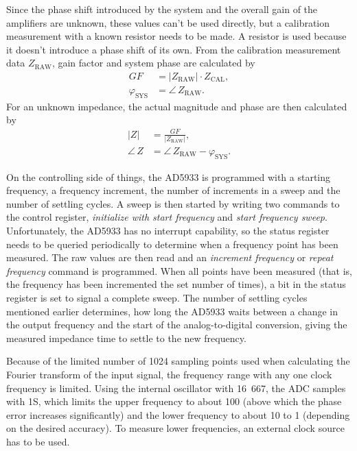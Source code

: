 Since the phase shift introduced by the system and the overall gain of the amplifiers are unknown, these values can't
be used directly, but a calibration measurement with a known resistor needs to be made. A resistor is used because
it doesn't introduce a phase shift of its own.
From the calibration measurement data $ Z_\text{RAW} $, gain factor and system phase are calculated by
\begin{align}
  GF &= \left| Z_\text{RAW} \right| \cdot Z_\text{CAL} , \\
  \varphi_\text{SYS} &= \angle\, Z_\text{RAW}.
\end{align}
For an unknown impedance, the actual magnitude and phase are then calculated by
\begin{align}
  \left| Z \right| &= \frac{GF}{\left| Z_\text{RAW} \right|} , \\
  \angle\, Z &= \angle\, Z_\text{RAW} - \varphi_\text{SYS}.
\end{align}

On the controlling side of things, the AD5933 is programmed with a starting frequency, a frequency increment, the
number of increments in a sweep and the number of settling cycles.
A sweep is then started by writing two commands to the control register, \emph{initialize with start frequency} and
\emph{start frequency sweep}. Unfortunately, the AD5933 has no interrupt capability, so the status register needs to
be queried periodically to determine when a frequency point has been measured. The raw values are then read and an
\emph{increment frequency} or \emph{repeat frequency} command is programmed. When all points have been measured
(that is, the frequency has been incremented the set number of times), a bit in the status register is set to signal a
complete sweep.
The number of settling cycles mentioned earlier determines, how long the AD5933 waits between a change
in the output frequency and the start of the analog-to-digital conversion, giving the measured impedance time to
settle to the new frequency.

Because of the limited number of 1024 sampling points used when calculating the Fourier transform of the input signal,
the frequency range with any one clock frequency is limited. Using the internal oscillator with
\unit{16.667}{\mega\hertz}, the ADC samples with \unit{1}{\mega{}S\per\second}, which limits the upper frequency to
about \unit{100}{\kilo\hertz} (above which the phase error increases significantly) and the lower frequency to about
\unit{10}{\kilo\hertz} to \unit{1}{\kilo\hertz} (depending on the desired accuracy).
To measure lower frequencies, an external clock source has to be used.


